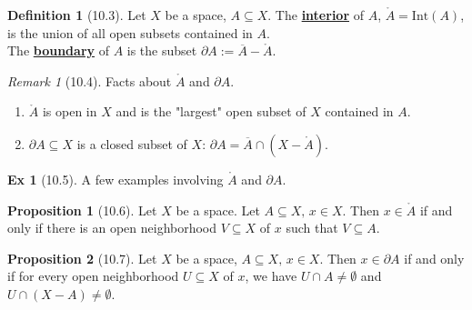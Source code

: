 \documentclass{article}
\newcommand{\R}{\ensuremath{\mathbb{R}}}
\newcommand{\Iff}{if and only if}
\newcommand{\nbd}{neighborhood}
\newcommand{\closure}[1]{\ensuremath{\overline{#1}}}
\newcommand{\Ball}[3][\empty]{\ensuremath{\overline{B}^{#1}_{#2}(#3)}}
\newcommand{\define}[1]{\textbf{\underline{#1}}}
\newcommand{\inter}{\cap}
\newcommand{\interior}[1]{\ensuremath{\mathring{#1}}}
\newcommand{\bound}[1]{\ensuremath{\partial #1}}
\renewcommand{\Subset}{\subseteq}
\theoremstyle{definition}
\newtheorem*{defn}{Definition}
\newtheorem*{prop}{Proposition}
\newtheorem*{ex}{Ex}
\theoremstyle{remark}
\newtheorem*{rem}{Remark}
\begin{document}
        \begin{defn}[10.3]
            Let $X$ be a space, $A \Subset X$. The \define{interior} of $A$, \define{$\interior{A} = \mathrm{Int}(A)$}, is the union of all open subsets contained in $A$.\\
            The \define{boundary} of $A$ is the subset \define{$\bound A := \closure{A} - \interior{A}$}.
        \end{defn}
        
        \begin{rem}[10.4] Facts about $\interior{A}$ and $\bound A$.
            \begin{enumerate}
                \item $\interior{A}$ is open in $X$ and is the "largest" open subset of $X$ contained in $A$.
                \item $\bound A \Subset X$ is a closed subset of $X$: $\bound A = \closure{A} \inter (X-\interior{A})$.
            \end{enumerate}
        \end{rem}
        
        \begin{ex}[10.5] A few examples involving $\interior{A}$ and $\bound A$.
        \end{ex}
        
        \begin{prop}[10.6]
            Let $X$ be a space. Let $A \Subset X, \, x \in X$. Then $x \in \interior{A}$ \Iff{} there is an open \nbd{} $V \Subset X$ of $x$ such that $V \Subset A$.
        \end{prop}
        
        \begin{prop}[10.7]
            Let $X$ be a space, $A \Subset X, \, x \in X$. Then $x \in \bound A$ \Iff{} for every open \nbd{} $U \Subset X$ of $x$, we have $U \inter A \neq \emptyset$ and $U \inter (X-A) \neq \emptyset$.
        \end{prop}
\end{document}
